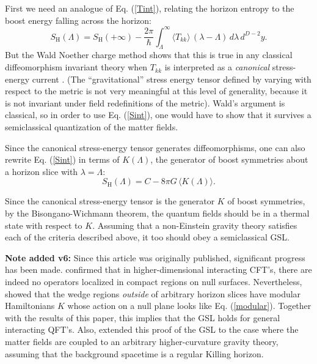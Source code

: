 \documentclass[12pt]{article}
\begin{document}
First we need an analogue of Eq. (\ref{Tint}), relating the horizon entropy to the boost energy falling across the horizon:
\begin{equation}\label{Sint}
S_\mathrm{H}(\Lambda) = S_\mathrm{H}(+\infty)
- \frac{2\pi}{\hbar} \int_\Lambda^\infty \langle T_{kk} \rangle \,(\lambda - \Lambda) \,d\lambda\,d^{D-2}y.
\end{equation}
But the Wald Noether charge method shows that this is true in any classical diffeomorphism invariant theory when $T_{kk}$ is interpreted as a \emph{canonical} stress-energy current \cite{WI94}.  (The ``gravitational'' stress energy tensor defined by varying with respect to the metric is not very meaningful at this level of generality, because it is not invariant under field redefinitions of the metric).  Wald's argument is classical, so in order to use Eq. (\ref{Sint}), one would have to show that it survives a semiclassical quantization of the matter fields.

Since the canonical stress-energy tensor generates diffeomorphisms, one can also rewrite Eq. (\ref{Sint}) in terms of $K(\Lambda)$, the generator of boost symmetries about a horizon slice with $\lambda = \Lambda$:
\begin{equation}
S_\mathrm{H}(\Lambda) = C - 8\pi G\,\langle K(\Lambda) \rangle.
\end{equation}

Since the canonical stress-energy tensor is the generator $K$ of boost symmetries, by the Bisongano-Wichmann theorem, the quantum fields should be in a thermal state with respect to $K$.  Assuming that a non-Einstein gravity theory satisfies each of the criteria described above, it too should obey a semiclassical GSL.

\textbf{Note added v6:} Since this article was originally published, significant progress has been made.  \cite{Bousso:2014uxa} confirmed that in higher-dimensional interacting CFT's, there are indeed no operators localized in compact regions on null surfaces.  Nevertheless, \cite{Casini:2017roe,Lashkari:2017rcl} showed that the wedge regions \emph{outside} of arbitrary horizon slices have modular Hamiltonians $K$ whose action on a null plane looks like Eq. (\ref{modular}).  Together with the results of this paper, this implies that the GSL holds for general interacting QFT's.  Also, \cite{Wall:2015raa} extended this proof of the GSL to the case where the matter fields are coupled to an arbitrary higher-curvature gravity theory, assuming that the background spacetime is a regular Killing horizon.
\end{document}
